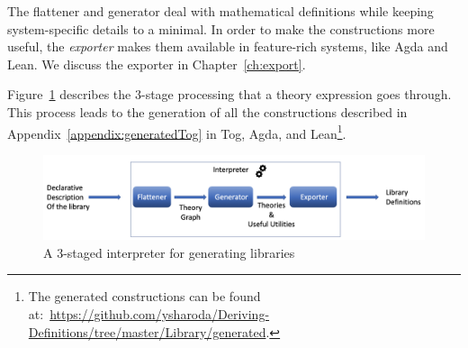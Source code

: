 The flattener and generator deal with mathematical definitions while keeping system-specific details to a minimal. In order to make the constructions more useful, the \emph{exporter} makes them available in feature-rich systems, like Agda and Lean. We discuss the exporter in Chapter~\ref{ch:export}. 

Figure~\ref{fig:staged-interpreter} describes the $3$-stage processing that a theory expression goes through. This process leads to the generation of all the constructions described in Appendix~\ref{appendix:generatedTog} in Tog, Agda, and Lean\footnote{The generated constructions can be found at:~\url{https://github.com/ysharoda/Deriving-Definitions/tree/master/Library/generated}.}. 
\begin{figure}
\includegraphics[scale=0.5,width=\linewidth]{figures/interpreter_detailed}
\caption{A $3$-staged interpreter for generating libraries}
\label{fig:staged-interpreter}
\end{figure} 

